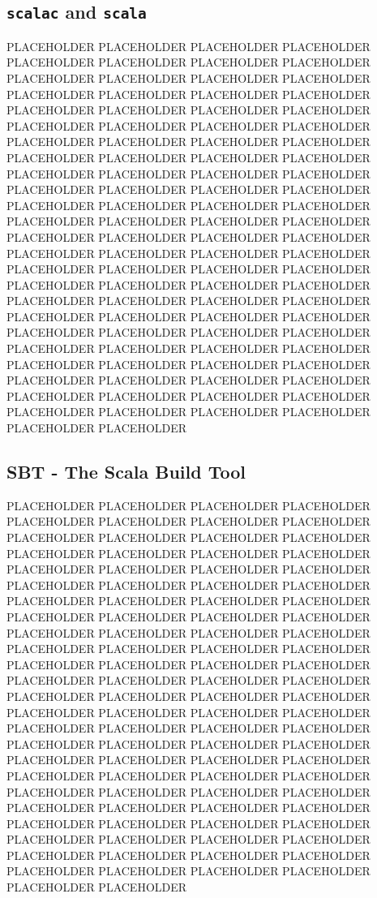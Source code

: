 \subsection{{\tt scalac} and {\tt scala} }

PLACEHOLDER PLACEHOLDER PLACEHOLDER PLACEHOLDER PLACEHOLDER PLACEHOLDER PLACEHOLDER PLACEHOLDER PLACEHOLDER PLACEHOLDER PLACEHOLDER PLACEHOLDER PLACEHOLDER PLACEHOLDER PLACEHOLDER PLACEHOLDER PLACEHOLDER PLACEHOLDER PLACEHOLDER PLACEHOLDER PLACEHOLDER PLACEHOLDER PLACEHOLDER PLACEHOLDER PLACEHOLDER PLACEHOLDER PLACEHOLDER PLACEHOLDER PLACEHOLDER PLACEHOLDER PLACEHOLDER PLACEHOLDER PLACEHOLDER PLACEHOLDER PLACEHOLDER PLACEHOLDER PLACEHOLDER PLACEHOLDER PLACEHOLDER PLACEHOLDER PLACEHOLDER PLACEHOLDER PLACEHOLDER PLACEHOLDER PLACEHOLDER PLACEHOLDER PLACEHOLDER PLACEHOLDER PLACEHOLDER PLACEHOLDER PLACEHOLDER PLACEHOLDER PLACEHOLDER PLACEHOLDER PLACEHOLDER PLACEHOLDER PLACEHOLDER PLACEHOLDER PLACEHOLDER PLACEHOLDER PLACEHOLDER PLACEHOLDER PLACEHOLDER PLACEHOLDER PLACEHOLDER PLACEHOLDER PLACEHOLDER PLACEHOLDER PLACEHOLDER PLACEHOLDER PLACEHOLDER PLACEHOLDER PLACEHOLDER PLACEHOLDER PLACEHOLDER PLACEHOLDER PLACEHOLDER PLACEHOLDER PLACEHOLDER PLACEHOLDER PLACEHOLDER PLACEHOLDER PLACEHOLDER PLACEHOLDER PLACEHOLDER PLACEHOLDER PLACEHOLDER PLACEHOLDER PLACEHOLDER PLACEHOLDER PLACEHOLDER PLACEHOLDER PLACEHOLDER PLACEHOLDER PLACEHOLDER PLACEHOLDER PLACEHOLDER PLACEHOLDER

\subsection{SBT - The Scala Build Tool}

PLACEHOLDER PLACEHOLDER PLACEHOLDER PLACEHOLDER PLACEHOLDER PLACEHOLDER PLACEHOLDER PLACEHOLDER PLACEHOLDER PLACEHOLDER PLACEHOLDER PLACEHOLDER PLACEHOLDER PLACEHOLDER PLACEHOLDER PLACEHOLDER PLACEHOLDER PLACEHOLDER PLACEHOLDER PLACEHOLDER PLACEHOLDER PLACEHOLDER PLACEHOLDER PLACEHOLDER PLACEHOLDER PLACEHOLDER PLACEHOLDER PLACEHOLDER PLACEHOLDER PLACEHOLDER PLACEHOLDER PLACEHOLDER PLACEHOLDER PLACEHOLDER PLACEHOLDER PLACEHOLDER PLACEHOLDER PLACEHOLDER PLACEHOLDER PLACEHOLDER PLACEHOLDER PLACEHOLDER PLACEHOLDER PLACEHOLDER PLACEHOLDER PLACEHOLDER PLACEHOLDER PLACEHOLDER PLACEHOLDER PLACEHOLDER PLACEHOLDER PLACEHOLDER PLACEHOLDER PLACEHOLDER PLACEHOLDER PLACEHOLDER PLACEHOLDER PLACEHOLDER PLACEHOLDER PLACEHOLDER PLACEHOLDER PLACEHOLDER PLACEHOLDER PLACEHOLDER PLACEHOLDER PLACEHOLDER PLACEHOLDER PLACEHOLDER PLACEHOLDER PLACEHOLDER PLACEHOLDER PLACEHOLDER PLACEHOLDER PLACEHOLDER PLACEHOLDER PLACEHOLDER PLACEHOLDER PLACEHOLDER PLACEHOLDER PLACEHOLDER PLACEHOLDER PLACEHOLDER PLACEHOLDER PLACEHOLDER PLACEHOLDER PLACEHOLDER PLACEHOLDER PLACEHOLDER PLACEHOLDER PLACEHOLDER PLACEHOLDER PLACEHOLDER PLACEHOLDER PLACEHOLDER PLACEHOLDER PLACEHOLDER PLACEHOLDER PLACEHOLDER

